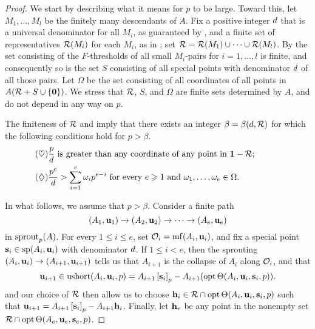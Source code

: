 \documentclass{amsart}
\begin{document}
\begin{proof}
   We start by describing what it means for $p$ to be large.
   Toward this, let $M_1, \ldots, M_l$ be the finitely many descendants of  $A$.
   Fix a positive integer $d$ that is a universal denominator for all $M_i$, as guaranteed by , and a finite set of representatives $\mathcal{R}(M_i)$ for each $M_i$, as in ; set $\mathcal{R} = \mathcal{R}(M_1) \cup \cdots \cup \mathcal{R}(M_l)$.
   By  the set consisting of the $F$-thresholds of all small $M_i$-pairs for $i=1,\ldots,l$ is finite, and consequently so is the set $S$ consisting of all special points with denominator $d$ of all those pairs.
   Let $\Omega$ be the set consisting of all coordinates of all points in $A(\mathcal{R}+S\cup\{\mathbf{0}\})$.
   We stress that $\mathcal{R}$, $S$, and $\Omega$ are finite sets determined by $A$, and do not depend in any way on $p$.

   The finiteness of $\mathcal{R}$  and 
   imply that there exists an integer $\beta = \beta(d, \mathcal{R})$ for which the following conditions hold for $p > \beta$.
    \begin{align}
      \tag{$\heartsuit$} \label{p-big-1}
      &\text{$\frac{p}{d}$ is greater than any coordinate of any point in $\mathbf{1} - \mathcal{R}$;}\qquad\qquad\quad \\
      \tag{$\diamondsuit$} \label{p-big-2}
      &\text{$\frac{p^e}{d} > \sum_{i=1}^e \omega_i p^{e-i}$ for every $e \geqslant 1$ and $\omega_1, \ldots, \omega_e \in \Omega$.}
    \end{align}

    In what follows, we assume that $p > \beta$.
    Consider a finite path
    \[ (A_1, \mathbf{u}_1) \to (A_2, \mathbf{u}_2) \to \cdots \to (A_e, \mathbf{u}_e) \]
    in $\operatorname{sprout}_p(A)$.
    For every $1 \leq i \leq e$, set $\mathcal{O}_i = \operatorname{mf}(A_i, \mathbf{u}_i)$, and fix a special point $\mathbf{s}_i \in \operatorname{sp}(A_i, \mathbf{u}_i)$ with denominator $d$.
    If $1 \leq i < e$, then the sprouting $(A_i, \mathbf{u}_i) \to (A_{i+1}, \mathbf{u}_{i+1})$ tells us that $A_{i+1}$ is the collapse of $A_i$ along $\mathcal{O}_i$, and that
    \[
       \mathbf{u}_{i+1} \in \operatorname{ushort}(A_i, \mathbf{u}_i, p)= A_{i+1} \left[ \mathbf{s}_i \right]_p - A_{i+1}(\operatorname{opt} \Theta( A_i, \mathbf{u}_i, \mathbf{s}_i, p)).
    \]
     and our choice of $\mathcal{R}$ then allow us to choose $\mathbf{h}_i \in \mathcal{R} \cap \operatorname{opt} \Theta ( A_i, \mathbf{u}_i, \mathbf{s}_i, p)$ such that $\mathbf{u}_{i+1} = A_{i+1} \left[ \mathbf{s}_i \right]_p - A_{i+1} \mathbf{h}_i$.
    Finally, let $\mathbf{h}_e$ be any point in the nonempty set $\mathcal{R} \cap \operatorname{opt} \Theta ( A_e, \mathbf{u}_e, \mathbf{s}_e, p)$.


\end{proof}
\end{document}
